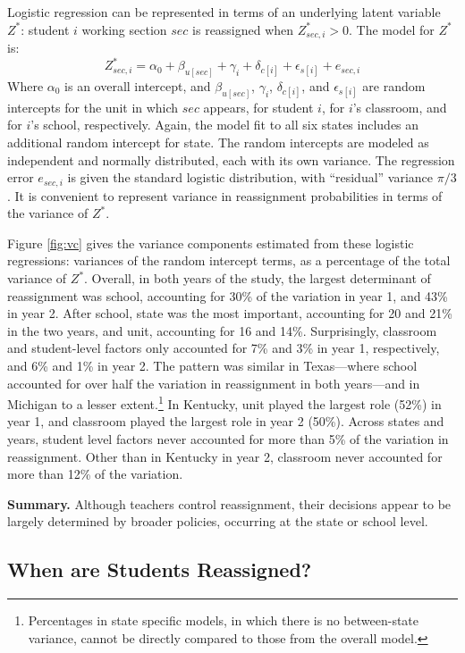 \documentclass[12pt]{article}\usepackage[]{graphicx}\usepackage[]{color}
\begin{document}
Logistic regression can be represented in terms of an underlying
latent variable $Z^*$: student $i$ working section $sec$ is reassigned
when $Z_{sec,i}^*>0$.
The model for $Z^*$ is:
\begin{equation*}
 Z^*_{sec,i}=\alpha_0+\beta_{u[sec]}+\gamma_i+\delta_{c[i]}+\epsilon_{s[i]}+e_{sec,i}
\end{equation*}
Where $\alpha_0$ is an overall intercept,
and $\beta_{u[sec]}$, $\gamma_i$, $\delta_{c[i]}$, and $\epsilon_{s[i]}$
are random intercepts for the unit in which $sec$ appears, for student
$i$, for $i$'s classroom, and for $i$'s school, respectively.
Again, the model fit to all six states includes an additional random
intercept for state.
The random intercepts are modeled as independent and normally
distributed, each with its own variance.
The regression error $e_{sec,i}$ is given the standard logistic
distribution, with ``residual'' variance $\pi/3$.
It is convenient to represent variance in reassignment probabilities
in terms of the variance of $Z^*$.

Figure \ref{fig:vc} gives the variance components estimated from these
logistic regressions: variances of the random intercept terms, as a
percentage of the total variance of $Z^*$.
Overall, in both years of the study, the largest determinant of
reassignment was school, accounting for
30\% of the variation in year 1,
and 43\% in year 2.
After school, state was the most important, accounting for
20 and
21\% in the two years, and unit,
accounting for 16 and 14\%.
Surprisingly, classroom and student-level factors only accounted for
7\% and
3\% in year 1, respectively,
and 6\% and
1\% in year 2.
The pattern was similar in Texas---where school accounted for over half
the variation in reassignment in both years---and in Michigan to a
lesser extent.\footnote{Percentages in state specific models, in which
  there is no between-state variance, cannot be
  directly compared to those from the overall model.}
In Kentucky, unit played the largest role
(52\%) in year 1, and classroom played
the largest role in year 2 (50\%).
Across states and years, student level factors never accounted for
more than 5\% of
the variation in reassignment.
Other than in Kentucky in year 2, classroom never accounted for more
than 12\%  of
the variation.

\textbf{Summary.} Although teachers control reassignment, their decisions appear to be largely
determined by broader policies, occurring at the state or school level.


\subsection{When are Students Reassigned?}
\end{document}
